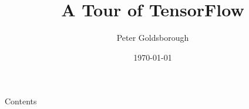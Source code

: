 




\begin{frame}
    \title{A Tour of TensorFlow}
    \author{Peter Goldsborough}
    \date\today
    \titlepage
\end{frame}


\begin{slide}{Contents}
    \tableofcontents
\end{slide}


